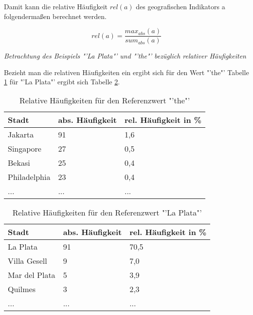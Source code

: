 				Damit kann die relative Häufigkeit  $rel(a)$ des geografischen Indikators a folgendermaßen berechnet werden.

				\begin{equation}
					rel(a)=\frac{max_{abs}(a)}{sum_{abs}(a)}
				\end{equation}	

			\textit{Betrachtung des Beispiels "'La Plata"' und "'the"' bezüglich relativer Häufigkeiten} 
				
				Bezieht man die relativen Häufigkeiten ein ergibt sich für den Wert "'the"' Tabelle \ref{tab:the} für "'La Plata"' ergibt sich Tabelle \ref{tab:laPlata}.  

				\begin{table}[h]
				\centering
				\caption{Relative Häufigkeiten für den Referenzwert "'the"'}
				\label{tab:the}
				\begin{tabular}{|l|l|l|}
				\hline
				Stadt             & abs. Häufigkeit & rel. Häufigkeit in \% \\ \hline \hline
				Jakarta           & 91              & 1,6                       \\ \hline
				Singapore         & 27              & 0,5                       \\ \hline
				Bekasi            & 25              & 0,4                       \\ \hline
				Philadelphia      & 23              & 0,4                       \\ \hline
				... & ... & ... \\ \hline
				\end{tabular}
				\end{table}

				\begin{table}[h]
				\centering
				\caption{Relative Häufigkeiten für den Referenzwert "'La Plata"'}
				\label{tab:laPlata}
				\begin{tabular}{|l|l|l|}
				\hline
				Stadt            & abs. Häufigkeit & rel. Häufigkeit in \% \\ \hline \hline
				La Plata         & 91              & 70,5                      \\ \hline
				Villa Gesell     & 9               & 7,0                       \\ \hline
				Mar del Plata    & 5               & 3,9                       \\ \hline
				Quilmes          & 3               & 2,3                       \\ \hline
				... & ... & ... \\ \hline
				\end{tabular}
				\end{table}

